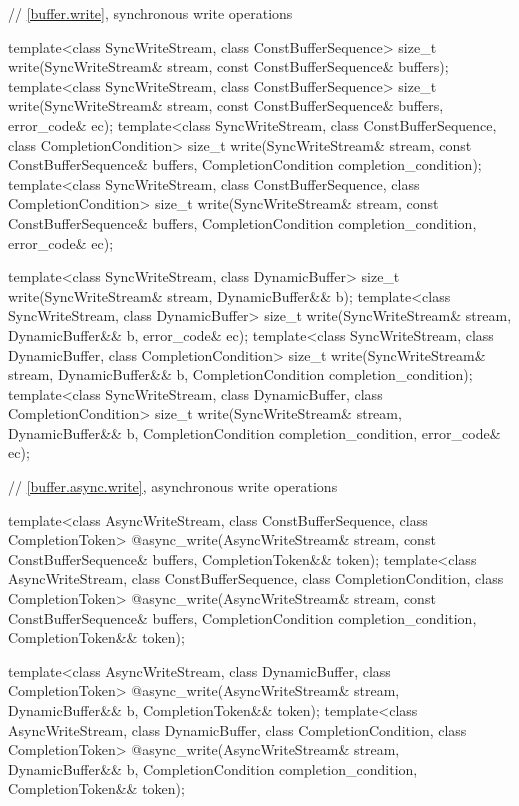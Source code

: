 \begin{codeblock}
{  // \ref{buffer.write}, synchronous write operations

  template<class SyncWriteStream, class ConstBufferSequence>
    size_t write(SyncWriteStream& stream,
                 const ConstBufferSequence& buffers);
  template<class SyncWriteStream, class ConstBufferSequence>
    size_t write(SyncWriteStream& stream,
                 const ConstBufferSequence& buffers, error_code& ec);
  template<class SyncWriteStream, class ConstBufferSequence,
    class CompletionCondition>
      size_t write(SyncWriteStream& stream,
                   const ConstBufferSequence& buffers,
                   CompletionCondition completion_condition);
  template<class SyncWriteStream, class ConstBufferSequence,
    class CompletionCondition>
      size_t write(SyncWriteStream& stream,
                   const ConstBufferSequence& buffers,
                   CompletionCondition completion_condition,
                   error_code& ec);

  template<class SyncWriteStream, class DynamicBuffer>
    size_t write(SyncWriteStream& stream, DynamicBuffer&& b);
  template<class SyncWriteStream, class DynamicBuffer>
    size_t write(SyncWriteStream& stream, DynamicBuffer&& b, error_code& ec);
  template<class SyncWriteStream, class DynamicBuffer, class CompletionCondition>
    size_t write(SyncWriteStream& stream, DynamicBuffer&& b,
                 CompletionCondition completion_condition);
  template<class SyncWriteStream, class DynamicBuffer, class CompletionCondition>
    size_t write(SyncWriteStream& stream, DynamicBuffer&& b,
                 CompletionCondition completion_condition, error_code& ec);

  // \ref{buffer.async.write}, asynchronous write operations

  template<class AsyncWriteStream, class ConstBufferSequence,
    class CompletionToken>
      @\DEDUCED@ async_write(AsyncWriteStream& stream,
                          const ConstBufferSequence& buffers,
                          CompletionToken&& token);
  template<class AsyncWriteStream, class ConstBufferSequence,
    class CompletionCondition, class CompletionToken>
      @\DEDUCED@ async_write(AsyncWriteStream& stream,
                          const ConstBufferSequence& buffers,
                          CompletionCondition completion_condition,
                          CompletionToken&& token);

  template<class AsyncWriteStream, class DynamicBuffer, class CompletionToken>
    @\DEDUCED@ async_write(AsyncWriteStream& stream,
                     DynamicBuffer&& b, CompletionToken&& token);
  template<class AsyncWriteStream, class DynamicBuffer,
    class CompletionCondition, class CompletionToken>
      @\DEDUCED@ async_write(AsyncWriteStream& stream,
                          DynamicBuffer&& b,
                          CompletionCondition completion_condition,
                          CompletionToken&& token);

}
\end{codeblock}

